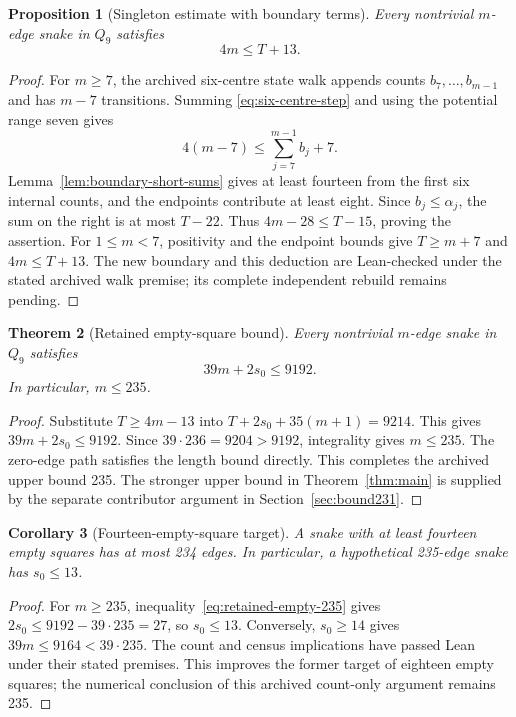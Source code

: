 \documentclass[11pt,a4paper]{article}
\newtheorem{theorem}{Theorem}[section]
\newtheorem{proposition}[theorem]{Proposition}
\newtheorem{corollary}[theorem]{Corollary}
\theoremstyle{definition}
\theoremstyle{remark}
\newcommand{\Q}{Q}
\begin{document}
\begin{proposition}[Singleton estimate with boundary terms]\label{prop:count-235}
Every nontrivial $m$-edge snake in $\Q_9$ satisfies
\begin{equation}\label{eq:count-235}
4m\le T+13.
\end{equation}
\end{proposition}
\begin{proof}
For $m\ge7$, the archived six-centre state walk appends counts
$b_7,\ldots,b_{m-1}$ and has $m-7$ transitions. Summing
\eqref{eq:six-centre-step} and using the potential range seven gives
\[
4(m-7)\le\sum_{j=7}^{m-1}b_j+7.
\]
Lemma~\ref{lem:boundary-short-sums} gives at least fourteen from the
first six internal counts, and the endpoints contribute at least eight.
Since $b_j\le\alpha_j$, the sum on the right is at most $T-22$.
Thus $4m-28\le T-15$, proving the assertion. For $1\le m<7$,
positivity and the endpoint bounds give $T\ge m+7$ and $4m\le T+13$.
The new boundary and this deduction are Lean-checked under the stated
archived walk premise; its complete independent rebuild remains pending.
\end{proof}

\begin{theorem}[Retained empty-square bound]\label{thm:upper235}
Every nontrivial $m$-edge snake in $\Q_9$ satisfies
\begin{equation}\label{eq:retained-empty-235}
\boxed{39m+2s_0\le9192.}
\end{equation}
In particular, $m\le235$.
\end{theorem}
\begin{proof}
Substitute $T\ge4m-13$ into $T+2s_0+35(m+1)=9214$.
This gives $39m+2s_0\le9192$. Since $39\cdot236=9204>9192$,
integrality gives $m\le235$. The zero-edge path satisfies the length
bound directly. This completes the archived upper bound 235. The stronger
upper bound in Theorem~\ref{thm:main} is supplied by the separate
contributor argument in Section~\ref{sec:bound231}.
\end{proof}

\begin{corollary}[Fourteen-empty-square target]\label{cor:eighteen-empty}\label{cor:fourteen-empty}
A snake with at least fourteen empty squares has at most 234 edges.
In particular, a hypothetical 235-edge snake has $s_0\le13$.
\end{corollary}
\begin{proof}
For $m\ge235$, inequality~\eqref{eq:retained-empty-235} gives
$2s_0\le9192-39\cdot235=27$, so $s_0\le13$.
Conversely, $s_0\ge14$ gives $39m\le9164<39\cdot235$.
The count and census implications have passed Lean under their stated
premises. This improves the former target of eighteen empty squares;
the numerical conclusion of this archived count-only argument remains 235.
\end{proof}
\end{document}
